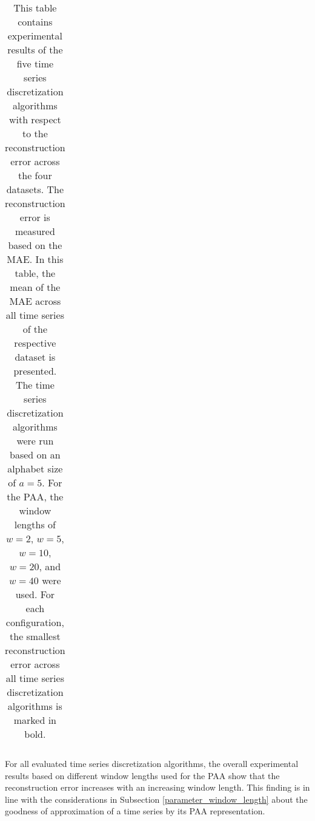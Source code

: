 \begin{table}[H]
\begin{tabular}{cccccc}
\bottomrule
\end{tabular}
\vspace*{0.5cm}
\caption[Reconstruction Error - Evaluation: Window Length]{This table contains experimental results of the five time series discretization algorithms with respect to the reconstruction error across the four datasets. The reconstruction error is measured based on the \ac{MAE}. In this table, the mean of the \ac{MAE} across all time series of the respective dataset is presented. The time series discretization algorithms were run based on an alphabet size of $a = 5$. For the \ac{PAA}, the window lengths of $w = 2$, $w = 5$, $w = 10$, $w = 20$, and $w = 40$ were used. For each configuration, the smallest reconstruction error across all time series discretization algorithms is marked in bold.}
\label{tab:recon_error_window_length}
\end{table}
For all evaluated time series discretization algorithms, the overall experimental results based on different window lengths used for the \ac{PAA} show that the reconstruction error increases with an increasing window length. This finding is in line with the considerations in Subsection \ref{parameter_window_length} about the goodness of approximation of a time series by its \ac{PAA} representation. \newline
